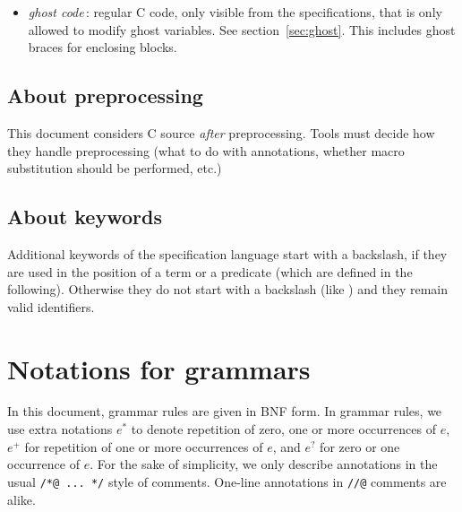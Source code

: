 \begin{itemize}
\begin{itemize}
  \item \emph{ghost code}\,: regular C code, only visible from the
    specifications, that is only allowed to modify ghost
    variables. See section~\ref{sec:ghost}. This includes ghost braces
    for enclosing blocks.

  \end{itemize}


\end{itemize}



\subsection{About preprocessing}

This document considers C source \emph{after} preprocessing.
Tools must decide how they handle preprocessing (what to do with
annotations, whether macro substitution should be performed, etc.)

\subsection{About keywords}

Additional keywords of the specification language start with a
backslash, if they are used in the position of a term or a predicate
(which are defined in the following).  Otherwise they do not start
with a backslash (like \ensures{}) and they remain valid identifiers.

\section{Notations for grammars}

In this document, grammar rules are given in BNF form. In grammar
rules, we use extra notations $e^*$ to denote repetition of zero, one
or more occurrences of $e$, $e^+$ for repetition of one or more
occurrences of $e$, and $e^?$ for zero or one occurrence of $e$.  For
the sake of simplicity, we only describe annotations in the usual
\lstinline|/*@ ... */| style of comments. One-line annotations
in \lstinline|//@| comments are alike.


